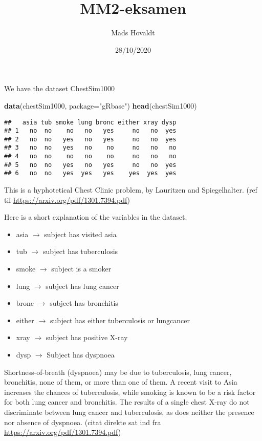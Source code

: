 \documentclass[
]{article}
\title{MM2-eksamen}
\author{Mads Hovaldt}
\date{28/10/2020}
\newenvironment{Shaded}{\begin{snugshade}}{\end{snugshade}}
\newcommand{\DataTypeTok}[1]{\textcolor[rgb]{0.13,0.29,0.53}{#1}}
\newcommand{\KeywordTok}[1]{\textcolor[rgb]{0.13,0.29,0.53}{\textbf{#1}}}
\newcommand{\NormalTok}[1]{#1}
\newcommand{\StringTok}[1]{\textcolor[rgb]{0.31,0.60,0.02}{#1}}
\providecommand{\tightlist}{%
  \setlength{\itemsep}{0pt}\setlength{\parskip}{0pt}}
\begin{document}
\maketitle

We have the dataset ChestSim1000

\begin{Shaded}
\begin{Highlighting}[]
\KeywordTok{data}\NormalTok{(chestSim1000, }\DataTypeTok{package=}\StringTok{"gRbase"}\NormalTok{)}
\KeywordTok{head}\NormalTok{(chestSim1000)}
\end{Highlighting}
\end{Shaded}

\begin{verbatim}
##   asia tub smoke lung bronc either xray dysp
## 1   no  no    no   no   yes     no   no  yes
## 2   no  no   yes   no   yes     no   no  yes
## 3   no  no   yes   no    no     no   no   no
## 4   no  no    no   no    no     no   no   no
## 5   no  no   yes   no   yes     no   no  yes
## 6   no  no   yes  yes   yes    yes  yes  yes
\end{verbatim}

This is a hyphotetical Chest Clinic problem, by Lauritzen and
Spiegelhalter. (ref til \url{https://arxiv.org/pdf/1301.7394.pdf})

Here is a short explanation of the variables in the dataset.

\begin{itemize}
\tightlist
\item
  asia \(\rightarrow\) subject has visited asia
\item
  tub \(\rightarrow\) subject has tuberculosis
\item
  smoke \(\rightarrow\) subject is a smoker
\item
  lung \(\rightarrow\) subject has lung cancer
\item
  bronc \(\rightarrow\) subject has bronchitis
\item
  either \(\rightarrow\) subject has either tuberculosis or lungcancer
\item
  xray \(\rightarrow\) subject has positive X-ray
\item
  dysp \(\rightarrow\) Subject has dyspnoea
\end{itemize}

Shortness-of-breath (dyspnoea) may be due to tuberculosis, lung cancer,
bronchitis, none of them, or more than one of them. A recent visit to
Asia increases the chances of tuberculosis, while smoking is known to be
a risk factor for both lung cancer and bronchitis. The results of a
single chest X-ray do not discriminate between lung cancer and
tuberculosis, as does neither the presence nor absence of dyspnoea.
(citat direkte sat ind fra \url{https://arxiv.org/pdf/1301.7394.pdf})
\end{document}

